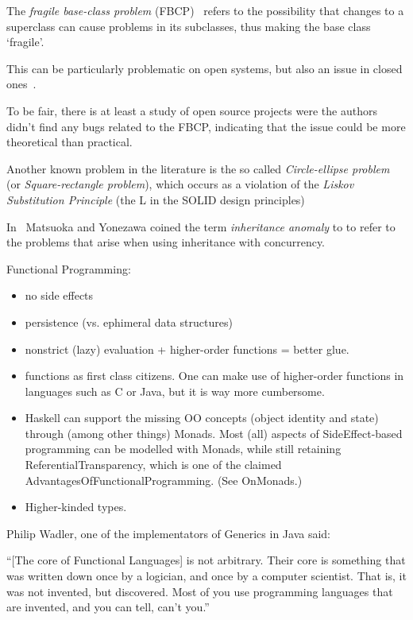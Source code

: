 \documentclass{article}
\begin{document}
The \textit{fragile base-class problem} (FBCP)~\cite{MS98} refers to the
possibility that changes to a superclass can cause problems in its
subclasses, thus making the base class `fragile'.

This can be particularly problematic on open systems, but also an issue in
closed ones~\cite{MS98}. %

To be fair, there is at least a study\cite{S17} of open source projects were
the authors didn't find any bugs related to the FBCP, indicating that the
issue could be more theoretical than practical.

Another known problem in the literature is the so called
\textit{Circle-ellipse problem}\cite{Cli94, Maj98} (or
\textit{Square-rectangle problem}), which occurs as a violation of the
\textit{Liskov Substitution Principle} (the L in the SOLID design principles)

In~\cite{MY93} Matsuoka and Yonezawa coined the term \textit{inheritance
anomaly} to to refer to the problems that arise when using inheritance with
concurrency.

\newpage

Functional Programming:
\begin{itemize}
  \item no side effects
  \item persistence (vs. ephimeral data structures)
  \item nonstrict (lazy) evaluation + higher-order functions = better glue.
  \item functions as first class citizens. One can make use of higher-order
  functions in languages such as C or Java, but it is way more cumbersome.
  \item Haskell can support the missing OO concepts (object identity and
  state) through (among other things) Monads. Most (all) aspects of SideEffect-based programming
  can be modelled with Monads, while still retaining ReferentialTransparency,
  which is one of the claimed AdvantagesOfFunctionalProgramming. (See
  OnMonads.)
  \item Higher-kinded types.
\end{itemize}

Philip Wadler, one of the implementators of Generics in Java said:

\enquote{[The core of Functional Languages] is not arbitrary. Their core is
something that was written down once by a logician, and once by a computer
scientist. That is, it was not invented, but discovered. Most of you use
programming languages that are invented, and you can tell, can't you.}
\end{document}
